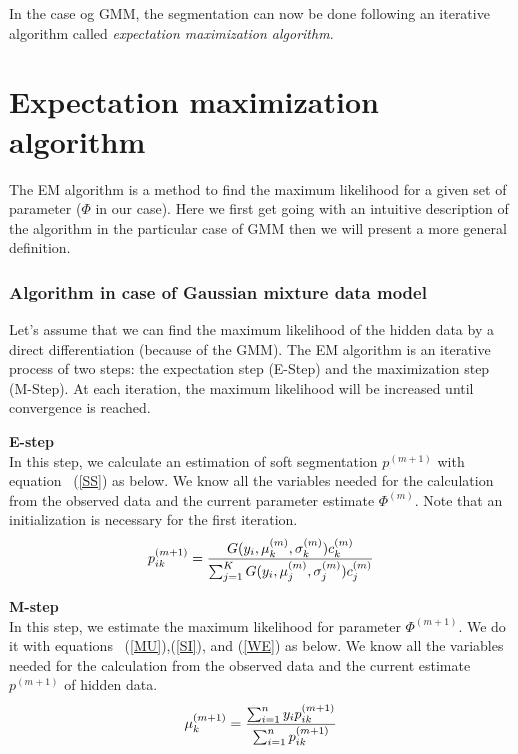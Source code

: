 In the case og GMM, the segmentation can now be done following an iterative algorithm called \textit{expectation maximization algorithm}.
%
\section{Expectation maximization algorithm}
The EM algorithm is a method to find the maximum likelihood for a given set of parameter ($\Phi$ in our case). Here we first get going with an 
intuitive description of the algorithm in the particular case of GMM then we will present a more general definition.
%
\subsubsection{Algorithm in case of Gaussian mixture data model}
Let's assume that we can find the maximum likelihood of the hidden data by a direct differentiation (because of the GMM). The EM algorithm is an iterative process of two steps: the expectation step (E-Step) and the maximization step (M-Step). At each iteration, the maximum likelihood will be increased until convergence is reached.\\
\par
\textbf{E-step}\\
In this step, we calculate an estimation of soft segmentation $p^{(m+1)}$ with equation ~(\ref{SS}) as below. We know all the variables needed for the calculation from the observed data and the current parameter estimate $\Phi^{(m)}$. Note that an initialization is necessary for the first iteration.\\

  \begin{equation*}
  p_{ik}^{(m+1)}= \frac{G(y_i,\mu_k^{(m)},\sigma_k^{(m)})c_k^{(m)}}{\sum_{j=1}^K G(y_i,\mu_j^{(m)},\sigma_j^{(m)})c_j^{(m)}}\\
  \end{equation*}

\par
\textbf{M-step}\\
In this step, we estimate the maximum likelihood for parameter $\Phi^{(m+1)}$. We do it with equations ~(\ref{MU}),(\ref{SI}), and (\ref{WE}) as below. We know all the variables needed for the calculation from the observed data and the current estimate $p^{(m+1)}$ of hidden data.\\

  \begin{equation*}
  \mu_k^{(m+1)} = \frac{\sum_{i=1}^n y_ip_{ik}^{(m+1)}}{\sum_{i=1}^n p_{ik}^{(m+1)}}\\
  \end{equation*}

